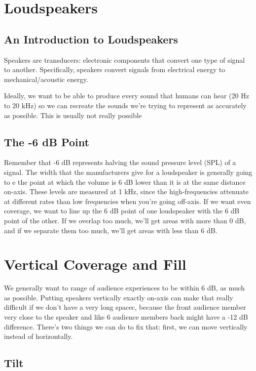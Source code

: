 \documentclass[a4paper]{article}
\begin{document}
\section{Loudspeakers}
\subsection{An Introduction to Loudspeakers}
Speakers are transducers: electronic components that convert one type of signal
to another. Specifically, speakers convert signals from electrical energy to
mechanical/acoustic energy.

Ideally, we want to be able to produce every sound that humans can hear (20 Hz
to 20 kHz) so we can recreate the sounds we're trying to represent as
accurately as possible. This is usually not really possible

\subsection{The -6 dB Point}
Remember that -6 dB represents halving the sound pressure level (SPL) of a
signal. The width that the manufacturers give for a loudspeaker is generally
going to e the point at which the volume is 6 dB lower than it is at the same
distance on-axis. These levels are measured at 1 kHz, since the
high-frequencies attenuate at different rates than low frequencies when you're
going off-axis. If we want even coverage, we want to line up the 6 dB point of
one loudspeaker with the 6 dB point of the other. If we overlap too much, we'll
get areas with more than 0 dB, and if we separate them too much, we'll get
areas with less than 6 dB.

\section{Vertical Coverage and Fill}
We generally want to range of audience experiences to be within 6 dB, as much
as possible. Putting speakers vertically exactly on-axis can make that really
difficult if we don't have a very long spacec, because the front audience
member very close to the speaker and like 6 audience members back might have a
-12 dB difference. There's two things we can do to fix that: first, we can move
vertically instead of horizontally.

\subsection{Tilt}
\end{document}
